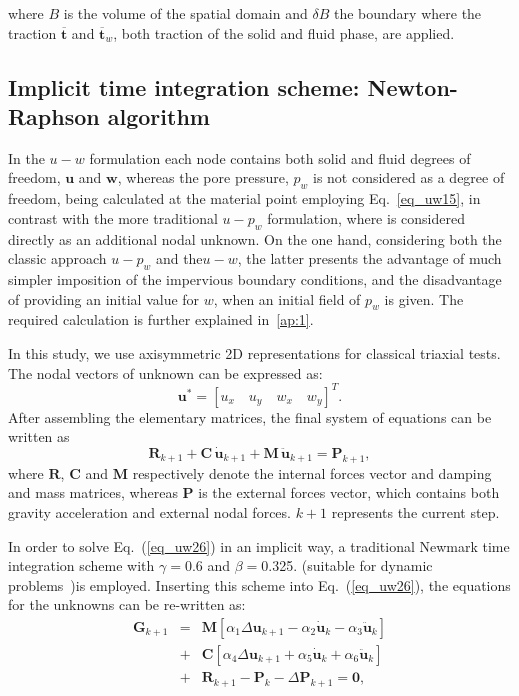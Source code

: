 \documentclass[preprint,12pt,a4paper]{elsarticle}
\begin{document}
where $B$ is the volume of the spatial domain and $\delta B$ the boundary where the traction $\boldsymbol{\overline{t}}$ and $\boldsymbol{\overline{t}}_w$, both traction of the solid and fluid phase, are applied.

\subsection{Implicit time integration scheme: Newton-Raphson algorithm}
\label{subsec:22}
In the $u-w$ formulation each node contains both solid and fluid degrees of freedom, $\boldsymbol{u}$ and $\boldsymbol{w}$, whereas the pore pressure, $p_w$ is not considered as a degree of freedom, being calculated at the material point employing Eq.~\eqref{eq_uw15}, in contrast with the more traditional  $u-p_w$ formulation, where is considered directly as an additional nodal unknown. On the one hand, 
considering both the classic approach $u-p_w$ and the$ u-w$, the latter presents the advantage of much simpler imposition of the impervious boundary conditions, and the disadvantage of providing an initial value for $w$, when an initial field of $p_w$ is given. The required calculation is further explained in~\ref{ap:1}.

In this study, we use axisymmetric 2D representations for classical triaxial tests. The nodal vectors of unknown can be expressed as:
 $$
 \boldsymbol{u}^*=
 \left[ u_x \quad  u_y \quad   w_x \quad  w_y \right]^T.
$$
After assembling the elementary matrices, the final system of equations can be written as
\begin{equation}\label{eq_uw26}
 \boldsymbol{ R}_{k+1}  +  \boldsymbol{C}  \,   \boldsymbol{\dot{u}}_{k+1} +   \boldsymbol{M}   \, \boldsymbol {\ddot{u}}_{k+1}= \boldsymbol{P }_{k+1},
\end{equation}
where   $\boldsymbol{R}$, $ \boldsymbol{C}$ and $  \boldsymbol{ M}$ respectively denote the internal forces vector and damping and mass matrices, whereas $ \boldsymbol{P}$ is the external forces vector, which contains both gravity acceleration and external nodal forces. ${k+1}$ represents the current step.

In order to solve Eq.~(\ref{eq_uw26}) in an implicit way, a traditional Newmark time integration scheme with $\gamma=$0.6 and $\beta=$0.325. (suitable for dynamic problems~\cite{Kontoe2006})is employed. Inserting this scheme into Eq.~(\ref{eq_uw26}),  the equations for the unknowns can be re-written as:
\begin{eqnarray}\label{eq_uw30}
\boldsymbol {G}_{k+1} &=& \boldsymbol {M}\left[\alpha_1\Delta\boldsymbol {u}_{k+1}-\alpha_2\boldsymbol {\dot{u}}_{k}-\alpha_3\boldsymbol {\ddot{u}}_{k}\right] \nonumber\\
&+& 
\boldsymbol {C}\left[\alpha_4\Delta\boldsymbol {u}_{k+1} + \alpha_5\boldsymbol {\dot{u}}_{k} + \alpha_6\boldsymbol {\ddot{u}}_{k}\right] 
\nonumber\\
&+& \boldsymbol {R}_{k+1}-\boldsymbol {P}_{k}-\Delta\boldsymbol {P}_{k+1}=\boldsymbol {0},
\end{eqnarray}
\end{document}
